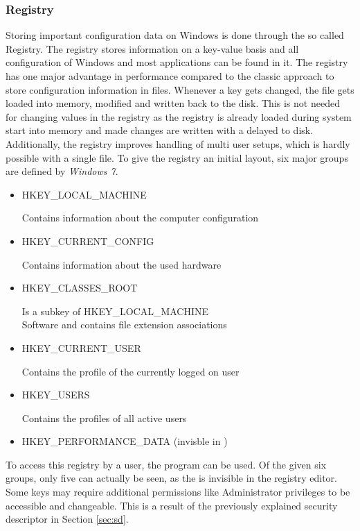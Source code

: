 \subsubsection{Registry}
Storing important configuration data on Windows is done through the so called Registry. The registry stores information on a key-value basis and all configuration of Windows and most applications can be found in it. The registry has one major advantage in performance compared to the classic approach to store configuration information in  files. Whenever a key gets changed, the  file gets loaded into memory, modified and written back to the disk. This is not needed for changing values in the registry as the registry is already loaded during system start into memory and made changes are written with a delayed to disk. Additionally, the registry improves handling of multi user setups, which is hardly possible with a single  file. To give the registry an initial layout, six major groups are defined by \emph{Windows 7}.
\begin{itemize}
\label{sec:registrykeys}
\item HKEY\_LOCAL\_MACHINE

Contains information about the computer configuration
\item HKEY\_CURRENT\_CONFIG

Contains information about the used hardware
\item HKEY\_CLASSES\_ROOT

Is a subkey of HKEY\_LOCAL\_MACHINE\\Software and contains file extension associations
\item HKEY\_CURRENT\_USER 

Contains the profile of the currently logged on user
\item HKEY\_USERS

Contains the profiles of all active users
\item HKEY\_PERFORMANCE\_DATA (invisble in )
\end{itemize}
To access this registry by a user, the  \cite{msdn_regedit} program can be used. Of the given six groups, only five can actually be seen, as the  is invisible in the registry editor. Some keys may require additional permissions like Administrator privileges to be accessible and changeable. This is a result of the previously explained security descriptor in Section \ref{sec:sd}.